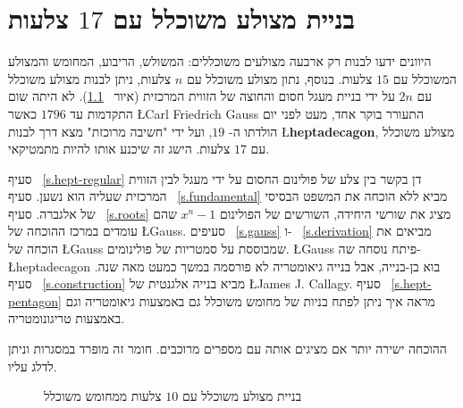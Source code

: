 

\chapter{בניית מצולע משוכלל עם 
$17$
צלעות}
\label{c.heptadecagon}


היוונים ידעו לבנות רק ארבעה מצולעים משוכללים: המשולש, הריבוע, המחומש והמצולע המשוכלל עם 
$15$
צלעות. בנוסף, נתון מצולע משוכלל עם
$n$
צלעות, ניתן לבנות מצולע משוכלל עם
$2n$
על ידי בניית מעגל חסום והחוצה של הזווית המרכזית (איור%
~\ref{f.hept-double}).
לא היתה שום התקדמות עד
$1796$
כאשר
\L{Carl Friedrich Gauss}
התעורר בוקר אחד, מעט לפני יום הולדתו ה-%
$19$,
ועל ידי "חשיבה מרוכזת" מצא דרך לבנות 
\L{\textbf{heptadecagon}},
מצולע משוכלל עם
$17$
צלעות. הישג זה שיכנע אותו להיות מתמטיקאי.

סעיף%
~\ref{s.hept-regular}
דן בקשר בין צלע של פולינום החסום על ידי מעגל לבין הזווית המרכזית שעליה הוא נשען. סעיף%
~\ref{s.fundamental}
מביא ללא הוכחה את המשפט הבסיסי של אלגברה. סעיף%
~\ref{s.roots}
מציג את שורשי היחידה, השורשים של הפולינום
$x^n-1$
שהם עומדים במרכז ההוכחה של
\L{Gauss}.
סעיפים%
~\ref{s.gauss}
ו-%
~\ref{s.derivation}
מביאים את הוכחה של
\L{Gauss}
שמבוססת על סמטריות של פולינומים.
\L{Gauss}
פיתח נוסחה שה-%
\L{heptadecagon}
בוא בן-בנייה, אבל בנייה גיאומטריה לא פורסמה במשך כמעט מאה שנה. סעיף%
~\ref{s.construction}
מביא בנייה אלגנטית של
\L{James J. Callagy}.
סעיף%
~\ref{s.hept-pentagon}
מראה איך ניתן לפתח בניות של מחומש משוכלל גם באמצעות גיאומטריה וגם באמצעות טריגונומטריה.

ההוכחה ישירה יותר אם מציגים אותה עם מספרים מרוכבים. חומר זה מופרד במסגרות וניתן לדלג עליו.
\begin{figure}[htb]
\begin{center}
\end{center}
\caption{בניית מצולע משוכלל עם $10$ צלעות ממחומש משוכלל}\label{f.hept-double}
\end{figure}

